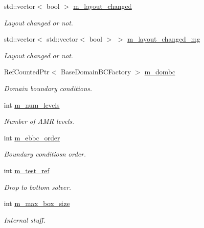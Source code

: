 \begin{DoxyCompactItemize}
std\+::vector$<$ bool $>$ \hyperlink{classnwomfconductivityopfactory_a870f179a8a1fbafc015f13dc8d48813f}{m\+\_\+layout\+\_\+changed}
\begin{DoxyCompactList}\small\item\em Layout changed or not. \end{DoxyCompactList}\item 
std\+::vector$<$ std\+::vector$<$ bool $>$ $>$ \hyperlink{classnwomfconductivityopfactory_a6b4e98b82cf6b8316d900f7f1618e925}{m\+\_\+layout\+\_\+changed\+\_\+mg}
\begin{DoxyCompactList}\small\item\em Layout changed or not. \end{DoxyCompactList}\item 
Ref\+Counted\+Ptr$<$ Base\+Domain\+B\+C\+Factory $>$ \hyperlink{classnwomfconductivityopfactory_a263604761a8b9549ee8e2024c53a7359}{m\+\_\+dombc}
\begin{DoxyCompactList}\small\item\em Domain boundary conditions. \end{DoxyCompactList}\item 
int \hyperlink{classnwomfconductivityopfactory_afe02ccd11418bf08c2a5dbf6bfd1842e}{m\+\_\+num\+\_\+levels}
\begin{DoxyCompactList}\small\item\em Number of A\+MR levels. \end{DoxyCompactList}\item 
int \hyperlink{classnwomfconductivityopfactory_a57dd42d5d4d3902837cb51da94e5ac3a}{m\+\_\+ebbc\+\_\+order}
\begin{DoxyCompactList}\small\item\em Boundary conditiosn order. \end{DoxyCompactList}\item 
int \hyperlink{classnwomfconductivityopfactory_a5f774e71547459513f2571984544b9cc}{m\+\_\+test\+\_\+ref}
\begin{DoxyCompactList}\small\item\em Drop to bottom solver. \end{DoxyCompactList}\item 
int \hyperlink{classnwomfconductivityopfactory_ac4757762d73be5308ca61907395b8977}{m\+\_\+max\+\_\+box\+\_\+size}
\begin{DoxyCompactList}\small\item\em Internal stuff. \end{DoxyCompactList}\item 

\end{DoxyCompactItemize}
